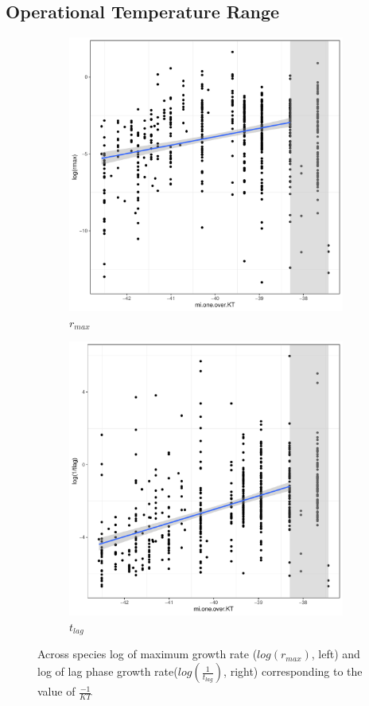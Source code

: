 \subsection{Operational Temperature Range}
\begin{figure}[htb]
\begin{subfigure}{.47\textwidth}
  \centering
  \includegraphics[width=.9\linewidth]{Plot/log_r_KT.pdf}
  \caption{$r_{max}$}
  \label{fig:log_r_KT}
\end{subfigure}%
\begin{subfigure}{.47\textwidth}
  \centering
  \includegraphics[width=.9\linewidth]{Plot/log_1tlag_KT.pdf}
  \caption{$t_{lag}$}
  \label{fig:log_1tlag_KT}
\end{subfigure}
\caption{Across species log of maximum growth rate ($log(r_{max})$, left) and log of lag phase growth rate($log(\frac{1}{t_{lag}})$, right) corresponding to the value of $\frac{-1}{KT}$}
\label{fig:rate_KT}
\end{figure}

